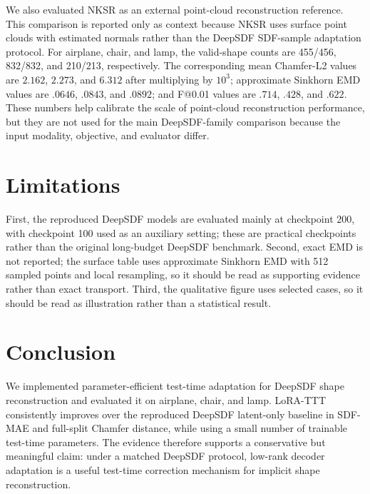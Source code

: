 \documentclass[letterpaper]{article}
\begin{document}
We also evaluated NKSR \cite{nksr} as an external point-cloud reconstruction reference. This comparison is reported only as context because NKSR uses surface point clouds with estimated normals rather than the DeepSDF SDF-sample adaptation protocol. For airplane, chair, and lamp, the valid-shape counts are 455/456, 832/832, and 210/213, respectively. The corresponding mean Chamfer-L2 values are $2.162$, $2.273$, and $6.312$ after multiplying by $10^3$; approximate Sinkhorn EMD values are $.0646$, $.0843$, and $.0892$; and F@0.01 values are $.714$, $.428$, and $.622$. These numbers help calibrate the scale of point-cloud reconstruction performance, but they are not used for the main DeepSDF-family comparison because the input modality, objective, and evaluator differ.

\section{Limitations}

First, the reproduced DeepSDF models are evaluated mainly at checkpoint 200, with checkpoint 100 used as an auxiliary setting; these are practical checkpoints rather than the original long-budget DeepSDF benchmark. Second, exact EMD is not reported; the surface table uses approximate Sinkhorn EMD with 512 sampled points and local resampling, so it should be read as supporting evidence rather than exact transport. Third, the qualitative figure uses selected cases, so it should be read as illustration rather than a statistical result.

\section{Conclusion}

We implemented parameter-efficient test-time adaptation for DeepSDF shape reconstruction and evaluated it on airplane, chair, and lamp. LoRA-TTT consistently improves over the reproduced DeepSDF latent-only baseline in SDF-MAE and full-split Chamfer distance, while using a small number of trainable test-time parameters. The evidence therefore supports a conservative but meaningful claim: under a matched DeepSDF protocol, low-rank decoder adaptation is a useful test-time correction mechanism for implicit shape reconstruction.
\end{document}
